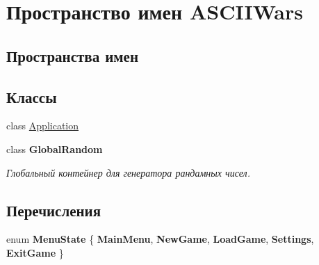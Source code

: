 \hypertarget{namespace_a_s_c_i_i_wars}{}\section{Пространство имен A\+S\+C\+I\+I\+Wars}
\label{namespace_a_s_c_i_i_wars}
\subsection*{Пространства имен}
\begin{DoxyCompactItemize}
\end{DoxyCompactItemize}
\subsection*{Классы}
\begin{DoxyCompactItemize}
\item 
class \hyperlink{class_a_s_c_i_i_wars_1_1_application}{Application}
\item 
class {\bfseries Global\+Random}
\begin{DoxyCompactList}\small\item\em Глобальный контейнер для генератора рандамных чисел. \end{DoxyCompactList}\end{DoxyCompactItemize}
\subsection*{Перечисления}
\begin{DoxyCompactItemize}
\item 
\hypertarget{namespace_a_s_c_i_i_wars_a9b8588e75dba14ac63aa79a49dd5a4eb}{}\label{namespace_a_s_c_i_i_wars_a9b8588e75dba14ac63aa79a49dd5a4eb} 
enum {\bfseries Menu\+State} \{ \newline
{\bfseries Main\+Menu}, 
{\bfseries New\+Game}, 
{\bfseries Load\+Game}, 
{\bfseries Settings}, 
\newline
{\bfseries Exit\+Game}
 \}
\end{DoxyCompactItemize}
